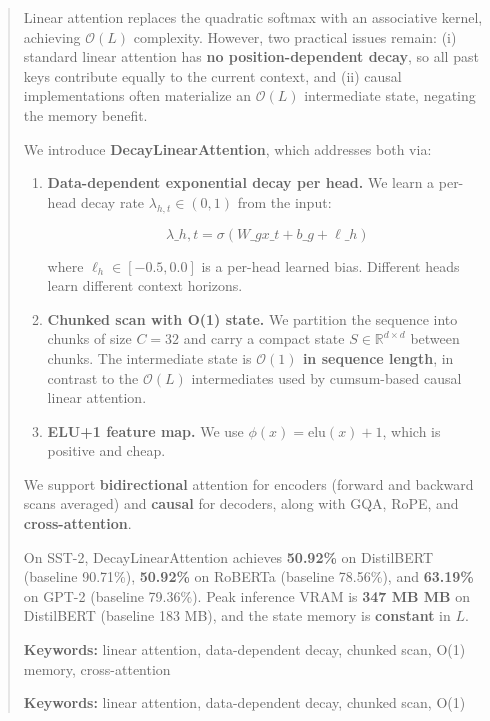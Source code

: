\documentclass[10pt,twocolumn,letterpaper]{article}
\begin{document}
\maketitle

\begin{abstract}
Linear attention replaces the quadratic softmax with an associative kernel, 
achieving $\mathcal{O}(L)$ complexity. However, two practical issues remain: 
(i) standard linear attention has \textbf{no position-dependent decay}, so all 
past keys contribute equally to the current context, and (ii) causal 
implementations often materialize an $\mathcal{O}(L)$ intermediate state, 
negating the memory benefit.

We introduce \textbf{DecayLinearAttention}, which addresses both via:

\begin{enumerate}
\item \textbf{Data-dependent exponential decay per head.} We learn a per-head decay
  rate $\lambda_{h,t} \in (0, 1)$ from the input:
  
  $$
  \lambda\_{h,t} = \sigma\!\left(W\_g x\_t + b\_g + \ell\_h\right)
  $$
  
  where $\ell_h \in [-0.5, 0.0]$ is a per-head
  learned bias. Different heads learn different context horizons.
\item \textbf{Chunked scan with O(1) state.} We partition the sequence into chunks
  of size $C = 32$ and carry a compact state
  $S \in \mathbb{R}^{d \times d}$ between chunks. The intermediate state is
  \textbf{$\mathcal{O}(1)$ in sequence length}, in contrast to the
  $\mathcal{O}(L)$ intermediates used by cumsum-based causal linear
  attention.
\item \textbf{ELU+1 feature map.} We use $\phi(x) = \text{elu}(x) + 1$, which is
  positive and cheap.

\end{enumerate}
We support \textbf{bidirectional} attention for encoders (forward and backward 
scans averaged) and \textbf{causal} for decoders, along with GQA, RoPE, and 
\textbf{cross-attention}.

On SST-2, DecayLinearAttention achieves \textbf{50.92\%} on DistilBERT 
(baseline 90.71\%), \textbf{50.92\%} on RoBERTa (baseline 78.56\%), 
and \textbf{63.19\%} on GPT-2 (baseline 79.36\%). Peak inference VRAM is 
\textbf{347 MB MB} on DistilBERT (baseline 183 MB), and the state 
memory is \textbf{constant} in $L$.

\textbf{Keywords:} linear attention, data-dependent decay, chunked scan, O(1) 
memory, cross-attention



\vspace{0.5em}
\noindent\textbf{Keywords:} linear attention, data-dependent decay, chunked scan, O(1)
\end{abstract}
\end{document}
